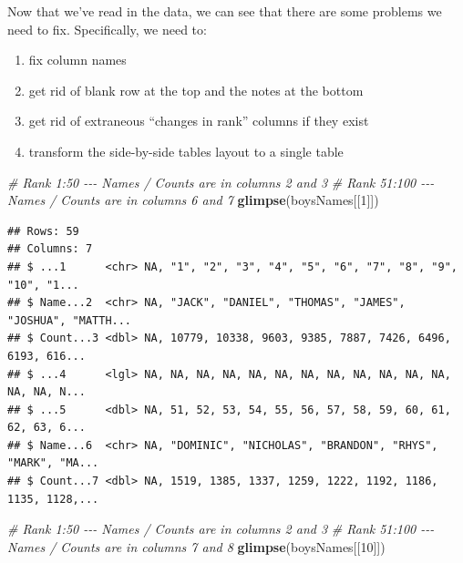 \documentclass[
]{book}
\newenvironment{Shaded}{\begin{snugshade}}{\end{snugshade}}
\newcommand{\CommentTok}[1]{\textcolor[rgb]{0.56,0.35,0.01}{\textit{#1}}}
\newcommand{\DecValTok}[1]{\textcolor[rgb]{0.00,0.00,0.81}{#1}}
\newcommand{\KeywordTok}[1]{\textcolor[rgb]{0.13,0.29,0.53}{\textbf{#1}}}
\newcommand{\NormalTok}[1]{#1}
\providecommand{\tightlist}{%
  \setlength{\itemsep}{0pt}\setlength{\parskip}{0pt}}
\begin{document}
Now that we've read in the data, we can see that there are some
problems we need to fix. Specifically, we need to:

\begin{enumerate}
\def\labelenumi{\arabic{enumi}.}
\tightlist
\item
  fix column names
\item
  get rid of blank row at the top and the notes at the bottom
\item
  get rid of extraneous ``changes in rank'' columns if they exist
\item
  transform the side-by-side tables layout to a single table
\end{enumerate}

\begin{Shaded}
\begin{Highlighting}[]
\CommentTok{\# Rank 1:50 {-}{-}{-} Names / Counts are in columns 2 and 3 }
\CommentTok{\# Rank 51:100 {-}{-}{-} Names / Counts are in columns 6 and 7}
\KeywordTok{glimpse}\NormalTok{(boysNames[[}\DecValTok{1}\NormalTok{]]) }
\end{Highlighting}
\end{Shaded}

\begin{verbatim}
## Rows: 59
## Columns: 7
## $ ...1      <chr> NA, "1", "2", "3", "4", "5", "6", "7", "8", "9", "10", "1...
## $ Name...2  <chr> NA, "JACK", "DANIEL", "THOMAS", "JAMES", "JOSHUA", "MATTH...
## $ Count...3 <dbl> NA, 10779, 10338, 9603, 9385, 7887, 7426, 6496, 6193, 616...
## $ ...4      <lgl> NA, NA, NA, NA, NA, NA, NA, NA, NA, NA, NA, NA, NA, NA, N...
## $ ...5      <dbl> NA, 51, 52, 53, 54, 55, 56, 57, 58, 59, 60, 61, 62, 63, 6...
## $ Name...6  <chr> NA, "DOMINIC", "NICHOLAS", "BRANDON", "RHYS", "MARK", "MA...
## $ Count...7 <dbl> NA, 1519, 1385, 1337, 1259, 1222, 1192, 1186, 1135, 1128,...
\end{verbatim}

\begin{Shaded}
\begin{Highlighting}[]
\CommentTok{\# Rank 1:50 {-}{-}{-} Names / Counts are in columns 2 and 3 }
\CommentTok{\# Rank 51:100 {-}{-}{-} Names / Counts are in columns 7 and 8}
\KeywordTok{glimpse}\NormalTok{(boysNames[[}\DecValTok{10}\NormalTok{]]) }
\end{Highlighting}
\end{Shaded}
\end{document}
